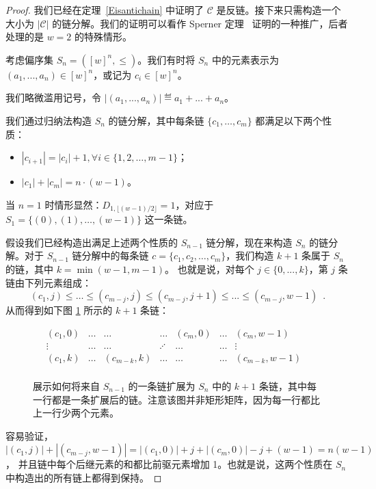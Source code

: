 \begin{proof}
    我们已经在定理~\ref{Eisantichain} 中证明了 $\mathcal{C}$ 是反链。接下来只需构造一个大小为 $|\mathcal{C}|$ 的链分解。我们的证明可以看作 Sperner 定理~\cite{sperner1928satz} 证明的一种推广，后者处理的是 $w=2$ 的特殊情形。

    考虑偏序集 $S_n=([w]^n,\leq)$。我们有时将 $S_n$ 中的元素表示为 $(a_1, ..., a_n)\in [w]^n$，或记为 $c_i\in [w]^n$。  我们略微滥用记号，令 $|(a_1, ..., a_n)| \eqdef a_1 + ... + a_n$。

    我们通过归纳法构造 $S_n$ 的链分解，其中每条链 $\{c_1,\ldots, c_{m}\}$ 都满足以下两个性质：
    \begin{itemize}
        \item $|c_{i+1}| = |c_i| + 1, \forall i \in \{1,2,\dots,m-1\}$；
        \item $|c_1| + |c_{m}| = n \cdot (w-1)$。
    \end{itemize}

    当 $n=1$ 时情形显然：$D_{1, \lfloor{(w-1)/2}\rfloor} = 1$，对应于
    $S_1=\{(0), (1), \ldots,  (w-1)\}$ 这一条链。

    假设我们已经构造出满足上述两个性质的 $S_{n-1}$ 链分解，现在来构造 $S_{n}$ 的链分解。对于 $S_{n-1}$ 链分解中的每条链
    $c=\{c_{1}, c_{2}, \ldots, c_{m}\}$，我们构造 $k+1$ 条属于 $S_n$ 的链，其中
    $k = \min(w-1, m - 1)$。
    也就是说，对每个 $j\in\{0,...,k\}$，第 $j$ 条链由下列元素组成：
$$ (c_{1}, j) \le \ldots \le (c_{m - j}, j) \le (c_{m - j}, j+1) \le ... \le (c_{m - j}, w-1) \enspace .$$
    从而得到如下图 \cref{fig:induction} 所示的 $k+1$ 条链：

\begin{figure}[ht]
\centering
    $$
    \begin{matrix}
    (c_{1},0) & \ldots & \ldots  & \ldots & (c_{m},0) & \ldots & (c_{m},w-1) &  \\
   \vdots  & \ldots & \ldots & \iddots & \ldots & \ldots &  \vdots & \\
     (c_{1},k) & \ldots &  (c_{m-k},k) & \ldots & \ldots & \ldots &  (c_{m-k},w-1)  &\\
    \end{matrix}
    $$
\caption{展示如何将来自 $S_{n-1}$ 的一条链扩展为 $S_n$ 中的 $k+1$ 条链，其中每一行都是一条扩展后的链。注意该图并非矩形矩阵，因为每一行都比上一行少两个元素。}
\label{fig:induction}
\end{figure}

容易验证，
$|(c_{1}, j)| + |(c_{m - j}, w-1)| = |(c_{1}, 0)|+j + |(c_{m}, 0)|- j+(w-1) = n(w-1)$，
并且链中每个后继元素的和都比前驱元素增加 1。也就是说，这两个性质在 $S_n$ 中构造出的所有链上都得到保持。


\end{proof}
